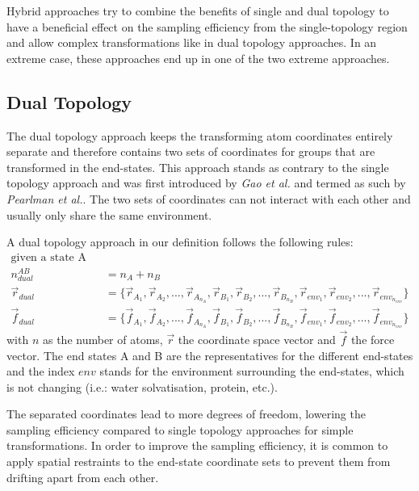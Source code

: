 Hybrid approaches try to combine the benefits of single and dual topology to have a beneficial effect on the sampling efficiency from the single-topology region and allow complex transformations like in dual topology approaches. In an extreme case, these approaches end up in one of the two extreme approaches. \cite{Jiang2019}

\subsection{Dual Topology}
The dual topology approach keeps the transforming atom coordinates entirely separate and therefore contains two sets of coordinates for groups that are transformed in the end-states. This approach stands as contrary  to the single topology approach and was first introduced by \textit{Gao et al.} and termed as such by \textit{Pearlman et al.}. \cite{Gao1989, Pearlman1991}
The two sets of coordinates can not interact with each other and usually only share the same environment. \cite{Riniker2011, Rocklin2013}

A dual topology approach in our definition follows the following rules:
\begin{align*}
    \text{given a state A and B:}\\
    n_{dual}^{AB} &= n_A + n_B\\
    \vec{r}_{dual} &= \{\vec{r}_{A_1}, \vec{r}_{A_2}, ..., \vec{r}_{A_{n_{A}}}, \vec{r}_{B_1}, \vec{r}_{B_2}, ..., \vec{r}_{B_{n_{B}}},\vec{r}_{env_1}, \vec{r}_{env_2}, ..., \vec{r}_{env_{n_{env}}}\}\\
    \vec{f}_{dual} &= \{\vec{f}_{A_1}, \vec{f}_{A_2}, ..., \vec{f}_{A_{n_{A}}},\vec{f}_{B_1}, \vec{f}_{B_2}, ..., \vec{f}_{B_{n_{B}}}, \vec{f}_{env_1}, \vec{f}_{env_2}, ..., \vec{f}_{env_{n_{env}}}\}
\end{align*}
with $n$ as the number of atoms, $\vec{r}$ the coordinate space vector and $\vec{f}$ the force vector. The end states A and B are the representatives for the different end-states and the index $env$ stands for the environment surrounding the end-states, which is not changing (i.e.: water solvatisation, protein, etc.).

The separated coordinates lead to more degrees of freedom, lowering the sampling efficiency compared to single topology approaches for simple transformations. In order to improve the sampling efficiency, it is common to apply spatial restraints to the end-state coordinate sets to prevent them from drifting apart from each other. \cite{Riniker2011, Mobley2006}

